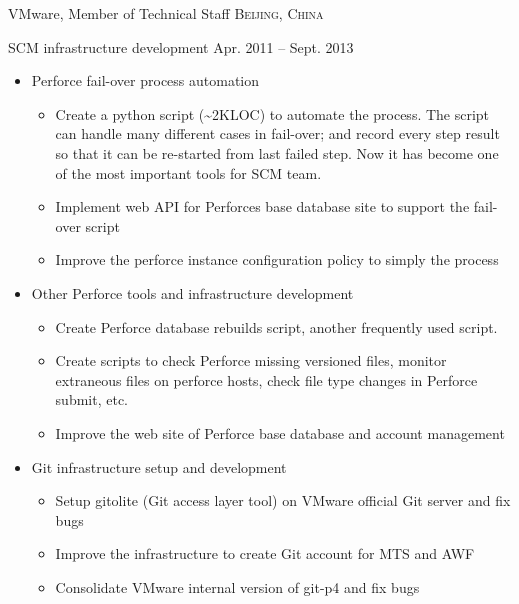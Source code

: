 \documentclass[10pt,letterpaper]{article}
\begin{document}
\headedsection
{VMware, Member of Technical Staff}
{\textsc{Beijing, China}}{

\headedsubsection %
{SCM infrastructure development} {Apr. 2011 -- Sept. 2013}
{
    \begin{itemize}
        \item Perforce fail-over process automation
            \begin{itemize}
                \item Create a python script (\~{}2KLOC) to automate the
                    process.  The script can handle many different cases in
                    fail-over; and record every step result so that it can be
                    re-started from last failed step. Now it has become one of
                    the most important tools for SCM team.
                \item Implement web API for Perforces base database site to support the
                    fail-over script
                \item Improve the perforce instance configuration policy to simply the
                    process
            \end{itemize}
        \item Other Perforce tools and infrastructure development
            \begin{itemize}
                \item   Create Perforce database rebuilds script, another frequently used
                    script.
                \item   Create scripts to check Perforce missing versioned files, monitor
                    extraneous files on perforce hosts, check file type changes in Perforce
                    submit, etc.
                \item   Improve the web site of Perforce base database and account management
            \end{itemize}
        \item Git infrastructure setup and development
            \begin{itemize}
                \item   Setup gitolite (Git access layer tool) on VMware official Git server
                    and fix bugs
                \item   Improve the infrastructure to create Git account for MTS and AWF
                \item   Consolidate VMware internal version of git-p4 and fix bugs

\end{itemize}
\end{itemize}}}
\end{document}
